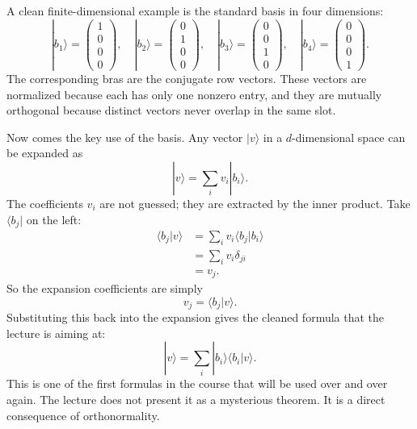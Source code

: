 A clean finite-dimensional example is the standard basis in four dimensions:
\begin{equation}
|b_1\rangle
=
\left(
\begin{array}{c}
1\\
0\\
0\\
0
\end{array}
\right),
\quad
|b_2\rangle
=
\left(
\begin{array}{c}
0\\
1\\
0\\
0
\end{array}
\right),
\quad
|b_3\rangle
=
\left(
\begin{array}{c}
0\\
0\\
1\\
0
\end{array}
\right),
\quad
|b_4\rangle
=
\left(
\begin{array}{c}
0\\
0\\
0\\
1
\end{array}
\right).
\end{equation}
The corresponding bras are the conjugate row vectors. These vectors are normalized because each has only one nonzero entry, and they are mutually orthogonal because distinct vectors never overlap in the same slot.

Now comes the key use of the basis. Any vector \(|v\rangle\) in a \(d\)-dimensional space can be expanded as
\begin{equation}
|v\rangle = \sum_i v_i |b_i\rangle.
\end{equation}
The coefficients \(v_i\) are not guessed; they are extracted by the inner product. Take \(\langle b_j|\) on the left:
\begin{align}
\langle b_j|v\rangle
&=
\sum_i v_i \langle b_j|b_i\rangle \\
&=
\sum_i v_i \delta_{ji} \\
&=
v_j.
\end{align}
So the expansion coefficients are simply
\begin{equation}
v_j = \langle b_j|v\rangle.
\end{equation}
Substituting this back into the expansion gives the cleaned formula that the lecture is aiming at:
\begin{equation}
|v\rangle = \sum_i |b_i\rangle \langle b_i|v\rangle.
\end{equation}
This is one of the first formulas in the course that will be used over and over again. The lecture does not present it as a mysterious theorem. It is a direct consequence of orthonormality.

